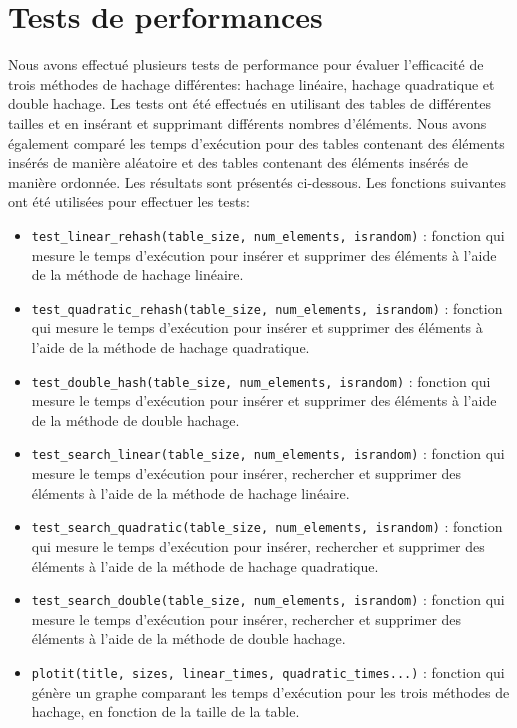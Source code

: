 \documentclass[12pt]{article}
\begin{document}
    \section{Tests de performances}\label{sec:Tests de performances}
    Nous avons effectué plusieurs tests de performance pour évaluer l'efficacité de trois méthodes de hachage différentes: hachage linéaire, hachage quadratique et double hachage.
    Les tests ont été effectués en utilisant des tables de différentes tailles et en insérant et supprimant différents nombres d'éléments.
    Nous avons également comparé les temps d'exécution pour des tables contenant des éléments insérés de manière aléatoire et des tables contenant des éléments insérés de manière ordonnée.
    Les résultats sont présentés ci-dessous.
    Les fonctions suivantes ont été utilisées pour effectuer les tests:
    \begin{itemize}
        \item \verb!test_linear_rehash(table_size, num_elements, israndom)! : fonction qui mesure le temps d'exécution pour insérer et supprimer des éléments à l'aide de la méthode de hachage linéaire.
        \item \verb!test_quadratic_rehash(table_size, num_elements, israndom)! : fonction qui mesure le temps d'exécution pour insérer et supprimer des éléments à l'aide de la méthode de hachage quadratique.
        \item \verb!test_double_hash(table_size, num_elements, israndom)! : fonction qui mesure le temps d'exécution pour insérer et supprimer des éléments à l'aide de la méthode de double hachage.
        \item \verb!test_search_linear(table_size, num_elements, israndom)! : fonction qui mesure le temps d'exécution pour insérer, rechercher et supprimer des éléments à l'aide de la méthode de hachage linéaire.
        \item \verb!test_search_quadratic(table_size, num_elements, israndom)! : fonction qui mesure le temps d'exécution pour insérer, rechercher et supprimer des éléments à l'aide de la méthode de hachage quadratique.
        \item \verb!test_search_double(table_size, num_elements, israndom)! : fonction qui mesure le temps d'exécution pour insérer, rechercher et supprimer des éléments à l'aide de la méthode de double hachage.
        \item \verb!plotit(title, sizes, linear_times, quadratic_times...)! : fonction qui génère un graphe comparant les temps d'exécution pour les trois méthodes de hachage, en fonction de la taille de la table.
    \end{itemize}
\end{document}
